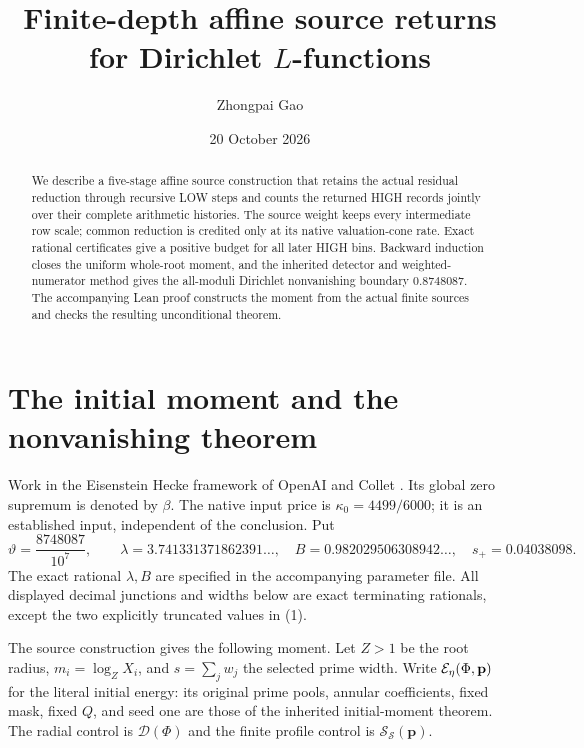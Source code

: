\documentclass[10pt,a4paper]{article}
\title{Finite-depth affine source returns for Dirichlet \texorpdfstring{$L$}{L}-functions}
\author{Zhongpai Gao}\date{20 October 2026}
\newcommand{\tht}{\vartheta}\newcommand{\kap}{\kappa}
\newcommand{\cS}{\mathcal S}\newcommand{\cD}{\mathcal D}
\begin{document}
\maketitle\vspace{-2em}
\begin{abstract}
We describe a five-stage affine source construction that retains the actual
residual reduction through recursive LOW steps and counts the returned HIGH
records jointly over their complete arithmetic histories. The source weight
keeps every intermediate row scale; common reduction is credited only at its
native valuation-cone rate. Exact rational certificates give a positive
budget for all later HIGH bins. Backward induction closes the uniform
whole-root moment, and the inherited detector and weighted-numerator method
gives the all-moduli Dirichlet nonvanishing boundary $0.8748087$.
The accompanying Lean proof constructs the moment from the actual finite
sources and checks the resulting unconditional theorem.
\end{abstract}

\section{The initial moment and the nonvanishing theorem}
Work in the Eisenstein Hecke framework of OpenAI and Collet
\cite{openai,collet}. Its global zero supremum is denoted by $\beta$.
The native input price is $\kap_0=4499/6000$; it is an established input,
independent of the conclusion. Put
\[
 \tht=\frac{8748087}{10^7},\qquad
 \lambda=3.741331371862391\ldots,\quad
 B=0.982029506308942\ldots,\quad s_+=0.04038098.       \tag{1}
\]
The exact rational $\lambda,B$ are specified in the accompanying parameter
file. All displayed decimal junctions and widths below are exact terminating
rationals, except the two explicitly truncated values in (1).

The source construction gives the following moment. Let $Z>1$ be the root
radius, $m_i=\log_Z X_i$, and $s=\sum_j w_j$ the selected prime width.
Write $\mathcal E_\eta(\Phi,\mathbf p)$ for the literal initial energy: its original
prime pools, annular coefficients, fixed mask, fixed $Q$, and seed one are
those of the inherited initial-moment theorem. The radial control is
$\cD(\Phi)$ and the finite profile control is $\cS_{\mathscr S}(\mathbf p)$.
\end{document}
